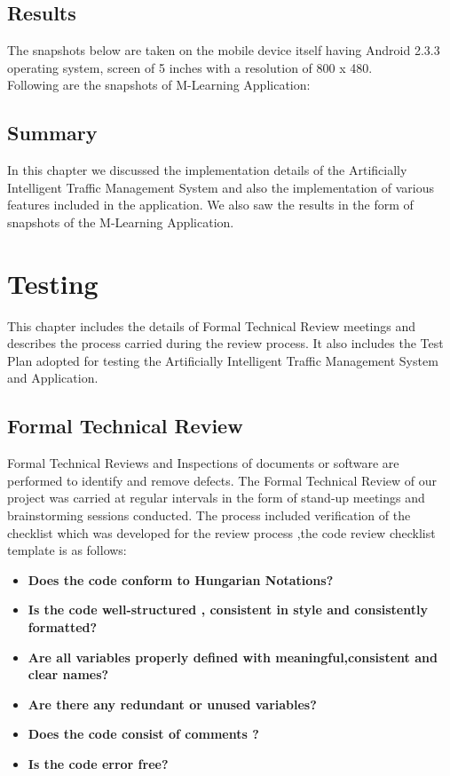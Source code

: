 \documentclass[openany,12pt]{report}
\begin{document}
		\section{Results}
		\hspace*{0.5in}The snapshots below are taken on the mobile device itself having Android 2.3.3 operating system, screen of 5 inches with a resolution of 800 x 480.\\
		\hspace*{0.5in}Following are the snapshots of M-Learning Application:
		
		\section{Summary}
		\hspace*{0.5in}In this chapter we discussed the implementation details of the Artificially Intelligent Traffic Management System and also the implementation of various features included in the application. We also saw the results in the form of snapshots of the M-Learning Application.
		
		
		\chapter{Testing}
		\hspace*{0.5in}This chapter includes the details of Formal Technical Review meetings and describes the process carried during the review process. It also includes the Test Plan adopted for testing the Artificially Intelligent Traffic Management System and Application.
		\section{Formal Technical Review}
		\hspace*{0.5in}Formal Technical Reviews and Inspections of documents or software are performed to identify and remove defects. The Formal Technical Review of our project was carried at regular intervals in the form of stand-up meetings and brainstorming sessions conducted. The process included verification of the checklist which was developed for the review process ,the code review  checklist template is as follows:
		
		\begin{itemize}
			\item{\textbf{Does the code conform to Hungarian Notations?}}
			\item{\textbf{Is the code well-structured , consistent in style and consistently formatted?}}
			\item{\textbf{Are all variables properly defined with meaningful,consistent and clear names?}}
			\item{\textbf{Are there any redundant or unused variables?}}
			\item{\textbf{Does the code consist of comments ?}}
			\item{\textbf{Is the code error free?}}
			
		\end{itemize}
		
\end{document}
